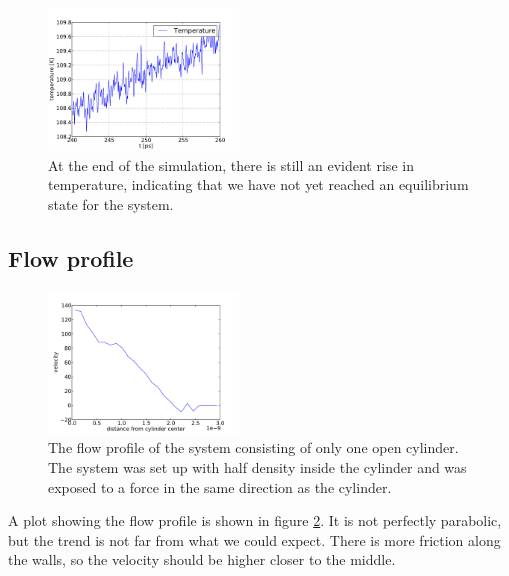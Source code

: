 \documentclass[reprint,floatfix,amsmath,amssymb,aps,pra]{revtex4-1}
\begin{document}
\begin{figure}
  \centering
  \includegraphics[width=0.45\textwidth]{../analysis/1j-cylinder-force/runs/2013-04-05_201107/1-thermalize/temperature0_90.pdf}
  \caption{At the end of the simulation, there is still an evident rise in temperature, indicating that we have not yet reached an equilibrium state for the system.}
  \label{fig:increasing-temperature}
\end{figure}


\subsection{Flow profile}

\begin{figure}
  \centering
  \includegraphics[width=0.45\textwidth]{../analysis/1j-cylinder-force/runs/2013-04-05_201107/flow-profile.pdf}
  \caption{The flow profile of the system consisting of only one open cylinder. The system was set up with half density inside the cylinder and was exposed to a force in the same direction as the cylinder.}
  \label{fig:flow-profile}
\end{figure}

A plot showing the flow profile is shown in figure \ref{fig:flow-profile}. It is not perfectly parabolic, but the trend is not far from what we could expect. There is more friction along the walls, so the velocity should be higher closer to the middle.
\end{document}
